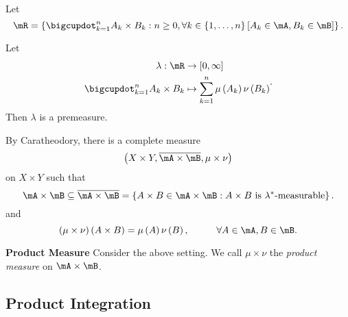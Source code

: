 \documentclass[pmath451]{subfiles}
\begin{document}
    \np Let
    \begin{equation*}
        \mR = \left\lbrace \bigcupdot^{n}_{k=1} A_k\times B_k : n\geq 0 , \forall k\in\left\lbrace 1,\ldots,n \right\rbrace\left[ A_k\in\mA,B_k\in\mB \right] \right\rbrace.
    \end{equation*}
    
    \begin{prop}{}
        Let
        \begin{equation*}
            \begin{aligned}
                \lambda:\mR&\to\left[ 0,\infty \right] \\
                \bigcupdot^{n}_{k=1} A_k\times B_k&\mapsto \sum^{n}_{k=1}\mu\left( A_k \right)\nu\left( B_k \right)
            \end{aligned} .
        \end{equation*}
        Then $\lambda$ is a premeasure.
    \end{prop}

    \rruleline

    \np By Caratheodory, there is a complete measure
    \begin{equation*}
        \left( X\times Y, \overline{\mA\times\mB}, \mu\times\nu \right)
    \end{equation*}
    on $X\times Y$ such that
    \begin{equation*}
        \mA\times\mB \subseteq \overline{\mA\times\mB} = \left\lbrace A\times B\in\mA\times\mB : A\times B\text{ is $\lambda^{*}$-measurable} \right\rbrace.
    \end{equation*}
    and
    \begin{equation*}
        \left( \mu\times\nu \right)\left( A\times B \right) = \mu\left( A \right)\nu\left( B \right), \hspace{1cm}\forall A\in\mA, B\in\mB.
    \end{equation*}
    
    \begin{definition}{\textbf{Product Measure}}
        Consider the above setting. We call $\mu\times\nu$ the \emph{product measure} on $\mA\times\mB$.
    \end{definition}
    
    \subsection{Product Integration}
    
\end{document}
